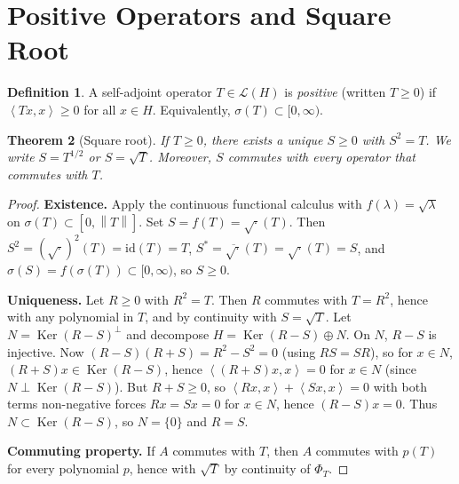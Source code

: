 \documentclass[a4paper,12pt]{book}
\DeclareMathOperator{\Ker}{Ker}
\newcommand{\norm}[1]{\left\| #1 \right\|}
\newcommand{\inner}[2]{\left\langle #1, #2 \right\rangle}
\theoremstyle{definition}
\newtheorem{definition}{Definition}[chapter]
\theoremstyle{plain}
\newtheorem{theorem}[definition]{Theorem}
\theoremstyle{remark}
\begin{document}

\section{Positive Operators and Square Root}\label{sec:positive-sqrt}


\begin{definition}\label{def:positive-op}
A self-adjoint operator $T \in \mathcal{L}(H)$ is \emph{positive} (written
$T \ge 0$) if $\inner{Tx}{x} \ge 0$ for all $x \in H$. Equivalently,
$\sigma(T) \subset [0, \infty)$.
\end{definition}

\begin{theorem}[Square root]\label{thm:square-root}
If $T \ge 0$, there exists a unique $S \ge 0$ with $S^2 = T$. We write
$S = T^{1/2}$ or $S = \sqrt{T}$. Moreover, $S$ commutes with every operator
that commutes with $T$.
\end{theorem}

\begin{proof}
\textbf{Existence.} Apply the continuous functional calculus with
$f(\lambda) = \sqrt{\lambda}$ on $\sigma(T) \subset [0, \norm{T}]$. Set
$S = f(T) = \sqrt{\cdot}(T)$. Then $S^2 = (\sqrt{\cdot})^2(T) = \mathrm{id}(T) = T$,
$S^* = \overline{\sqrt{\cdot}}(T) = \sqrt{\cdot}(T) = S$, and
$\sigma(S) = f(\sigma(T)) \subset [0, \infty)$, so $S \ge 0$.

\textbf{Uniqueness.} Let $R \ge 0$ with $R^2 = T$. Then $R$ commutes with $T = R^2$,
hence with any polynomial in $T$, and by continuity with $S = \sqrt{T}$.
Let $N = \Ker(R - S)^\perp$ and decompose $H = \Ker(R - S) \oplus N$. On $N$,
$R - S$ is injective. Now $(R - S)(R + S) = R^2 - S^2 = 0$ (using $RS = SR$),
so for $x \in N$, $(R + S)x \in \Ker(R - S)$, hence
$\inner{(R+S)x}{x} = 0$ for $x \in N$ (since $N \perp \Ker(R - S)$). But
$R + S \ge 0$, so $\inner{Rx}{x} + \inner{Sx}{x} = 0$ with both terms
non-negative forces $Rx = Sx = 0$ for $x \in N$, hence $(R - S)x = 0$. Thus
$N \subset \Ker(R - S)$, so $N = \{0\}$ and $R = S$.

\textbf{Commuting property.} If $A$ commutes with $T$, then $A$ commutes with
$p(T)$ for every polynomial $p$, hence with $\sqrt{T}$ by continuity of
$\Phi_T$.
\end{proof}
\end{document}
